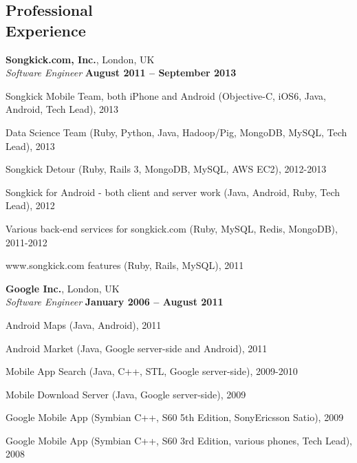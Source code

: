 \documentclass[margin = 0cm,line]{resume}
\begin{document}
\begin{resume}
    \section{\mysidestyle Professional\\Experience}

    \textbf{Songkick.com, Inc.}, London, UK \vspace{2mm}\\\vspace{1mm}%
    \textsl{Software Engineer} \hfill \textbf{August 2011 -- September 2013}\vspace{-3mm}\\\vspace{-1mm}%
    \begin{list2}
        \item Songkick Mobile Team, both iPhone and Android (Objective-C, iOS6, Java, Android, Tech Lead), 2013
        \item Data Science Team (Ruby, Python, Java, Hadoop/Pig, MongoDB, MySQL, Tech Lead), 2013
        \item Songkick Detour (Ruby, Rails 3, MongoDB, MySQL, AWS EC2), 2012-2013
        \item Songkick for Android - both client and server work (Java, Android, Ruby, Tech Lead), 2012 
        \item Various back-end services for songkick.com (Ruby, MySQL, Redis, MongoDB), 2011-2012
        \item www.songkick.com features (Ruby, Rails, MySQL), 2011
    \end{list2}\vspace{-1.5mm}
    
    \textbf{Google Inc.}, London, UK \vspace{2mm}\\\vspace{1mm}%
    \textsl{Software Engineer} \hfill \textbf{January 2006 -- August 2011}\vspace{-3mm}\\\vspace{-1mm}%
    \begin{list2}
        \item Android Maps (Java,  Android), 2011
        \item Android Market (Java,  Google server-side and Android), 2011
        \item Mobile App Search (Java, C++, STL, Google server-side), 2009-2010
        \item Mobile Download Server (Java, Google server-side), 2009
        \item Google Mobile App (Symbian C++, S60 5th Edition, SonyEricsson Satio), 2009
        \item Google Mobile App (Symbian C++, S60 3rd Edition, various phones, Tech Lead), 2008
    \end{list2}\vspace{-1.5mm}


\end{resume}
\end{document}
